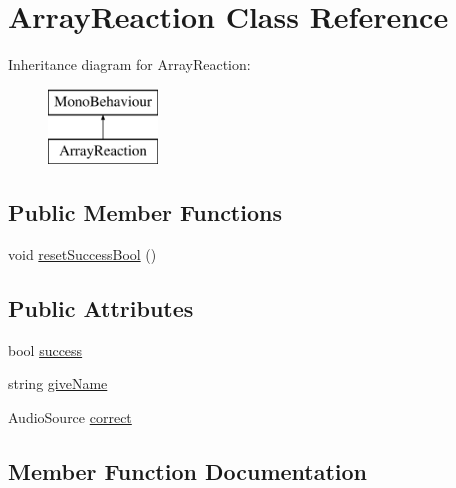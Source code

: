 \hypertarget{class_array_reaction}{}\section{Array\+Reaction Class Reference}
\label{class_array_reaction}
Inheritance diagram for Array\+Reaction\+:\begin{figure}[H]
\begin{center}
\leavevmode
\includegraphics[height=2.000000cm]{class_array_reaction}
\end{center}
\end{figure}
\subsection*{Public Member Functions}
\begin{DoxyCompactItemize}
\item 
void \hyperlink{class_array_reaction_ab805c31627d8e16a92813afad4a6e7bb}{reset\+Success\+Bool} ()
\end{DoxyCompactItemize}
\subsection*{Public Attributes}
\begin{DoxyCompactItemize}
\item 
bool \hyperlink{class_array_reaction_adf5df12cecfb640661571ae871e5be5d}{success}
\item 
string \hyperlink{class_array_reaction_aab057c39f78c1f0f9a2cacf8a7d23f6f}{give\+Name}
\item 
Audio\+Source \hyperlink{class_array_reaction_ad469f4e03562bf0773db8ca308997a10}{correct}
\end{DoxyCompactItemize}


\subsection{Member Function Documentation}
\mbox{\label{class_array_reaction_ab805c31627d8e16a92813afad4a6e7bb}} 

